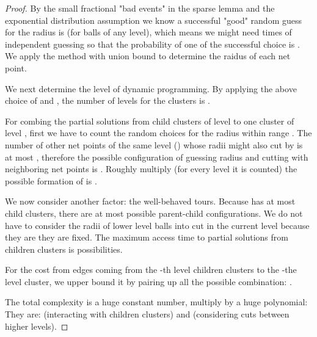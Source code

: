 \documentclass{llncs}
\begin{document}
\begin{proof}
By the small fractional "bad events" in the sparse lemma and the exponential distribution assumption we know a successful "good" random guess for the radius is  (for balls of any level), which means we might need  times of independent guessing so that the probability of one of the successful choice is . We apply the method with union bound to determine the raidus of each net point.

We next determine the level of dynamic programming.
By applying the above choice of  and , the number of levels for the clusters is .

For combing the partial solutions from child clusters of level  to one cluster  of level , first we have to count the  random choices for the radius within range .
The number of other net points of the same level () whose radii might also cut by  is at most , therefore the possible configuration of guessing radius and cutting with neighboring net points is .
Roughly multiply  (for every level it is counted) the possible formation of  is .

We now consider another factor: the well-behaved tours. 
Because  has at most  child clusters, there are at most  possible parent-child configurations.
We do not have to consider the radii of lower level balls into cut in the current level because they are they are fixed.
The maximum access time to partial solutions from children clusters is  possibilities.

For the cost from edges coming from the -th level children clusters to the -the level cluster, we upper bound it by pairing up all the possible combination: .

The total complexity is a huge constant number, multiply by a huge polynomial:
They are:  (interacting with children clusters) and  (considering cuts between higher levels).
\end{proof}
\end{document}
